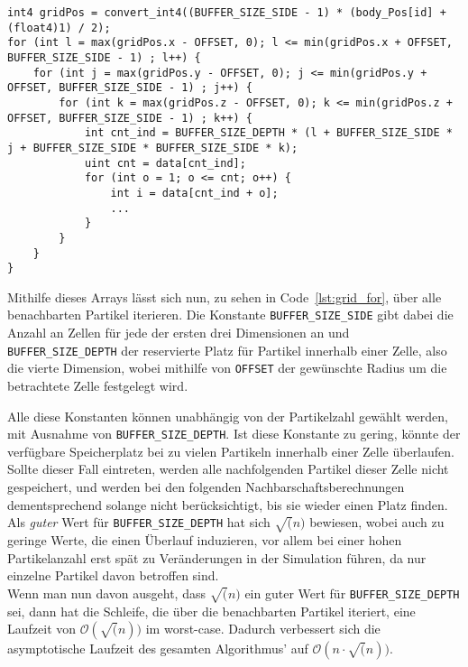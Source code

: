 \begin{minipage}{\linewidth}
\begin{lstlisting}[caption=Iteration über benachbarte Partikel, label=lst:grid_for]
int4 gridPos = convert_int4((BUFFER_SIZE_SIDE - 1) * (body_Pos[id] + (float4)1) / 2);
for (int l = max(gridPos.x - OFFSET, 0); l <= min(gridPos.x + OFFSET, BUFFER_SIZE_SIDE - 1) ; l++) {
	for (int j = max(gridPos.y - OFFSET, 0); j <= min(gridPos.y + OFFSET, BUFFER_SIZE_SIDE - 1) ; j++) {
		for (int k = max(gridPos.z - OFFSET, 0); k <= min(gridPos.z + OFFSET, BUFFER_SIZE_SIDE - 1) ; k++) {
			int cnt_ind = BUFFER_SIZE_DEPTH * (l + BUFFER_SIZE_SIDE * j + BUFFER_SIZE_SIDE * BUFFER_SIZE_SIDE * k);
			uint cnt = data[cnt_ind];			
			for (int o = 1; o <= cnt; o++) {
				int i = data[cnt_ind + o];
				...
			}
		}
	}
}
\end{lstlisting}
\end{minipage}

Mithilfe dieses Arrays lässt sich nun, zu sehen in Code~\ref{lst:grid_for}, über alle benachbarten Partikel iterieren. Die Konstante \texttt{BUFFER\_SIZE\_SIDE} gibt dabei die Anzahl an Zellen für jede der ersten drei Dimensionen an und \texttt{BUFFER\_SIZE\_DEPTH} der reservierte Platz für Partikel innerhalb einer Zelle, also die vierte Dimension, wobei mithilfe von \texttt{OFFSET} der gewünschte Radius um die betrachtete Zelle festgelegt wird.


Alle diese Konstanten können unabhängig von der Partikelzahl gewählt werden, mit Ausnahme von \texttt{BUFFER\_SIZE\_DEPTH}. Ist diese Konstante zu gering, könnte der verfügbare Speicherplatz bei zu vielen Partikeln innerhalb einer Zelle überlaufen. Sollte dieser Fall eintreten, werden alle nachfolgenden Partikel dieser Zelle nicht gespeichert, und werden bei den folgenden Nachbarschaftsberechnungen dementsprechend solange nicht berücksichtigt, bis sie wieder einen Platz finden.\\
Als \textit{guter} Wert für \texttt{BUFFER\_SIZE\_DEPTH} hat sich $\sqrt(n)$ bewiesen, wobei auch zu geringe Werte, die einen Überlauf induzieren, vor allem bei einer hohen Partikelanzahl erst spät zu Veränderungen in der Simulation führen, da nur einzelne Partikel davon betroffen sind.\\
Wenn man nun davon ausgeht, dass $\sqrt(n)$ ein guter Wert für \texttt{BUFFER\_SIZE\_DEPTH} sei, dann hat die Schleife, die über die benachbarten Partikel iteriert, eine Laufzeit von $\mathcal O(\sqrt(n))$ im worst-case. Dadurch verbessert sich die asymptotische Laufzeit des gesamten Algorithmus' auf $\mathcal O(n \cdot \sqrt(n))$.
